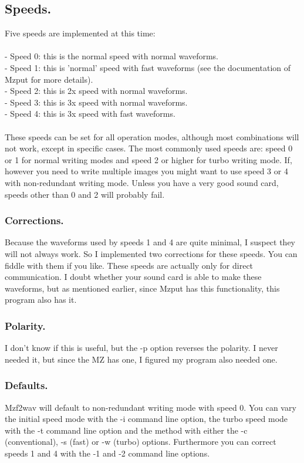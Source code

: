 \documentclass{article}
\begin{document}
\subsection{Speeds.}
Five speeds are implemented at this time: \\ \\
- Speed 0: this is the normal speed with normal waveforms. \\
- Speed 1: this is 'normal' speed with fast waveforms (see the documentation
of Mzput for more details). \\
- Speed 2: this is 2x speed with normal waveforms. \\
- Speed 3: this is 3x speed with normal waveforms. \\
- Speed 4: this is 3x speed with fast waveforms. \\ \\
These speeds can be set for all operation modes, although most combinations
will not work, except in specific cases. The most commonly used speeds are:
speed 0 or 1 for normal writing modes and speed 2 or higher for turbo writing
mode. If, however you need to write multiple images you might want to use
speed 3 or 4 with non-redundant writing mode. Unless you have a very good 
sound card, speeds other than 0 and 2 will probably fail.

\subsubsection{Corrections.}
Because the waveforms used by speeds 1 and 4 are quite minimal, I suspect
they will not always work. So I implemented two corrections for these speeds.
You can fiddle with them if you like. These speeds are actually only for
direct communication. I doubt whether your sound card is able to make these 
waveforms, but as mentioned earlier, since Mzput has this functionality, this
program also has it.

\subsubsection{Polarity.}
I don't know if this is useful, but the -p option reverses the polarity. I 
never needed it, but since the MZ has one, I figured my program also needed
one.

\subsubsection{Defaults.}
Mzf2wav will default to non-redundant writing mode with speed 0. You can vary 
the initial speed mode with the -i command line option, the turbo speed mode 
with the -t command line option and the method with either the -c 
(conventional), -s (fast) or -w (turbo) options. Furthermore you can correct 
speeds 1 and 4 with the -1 and -2 command line options.
\end{document}
